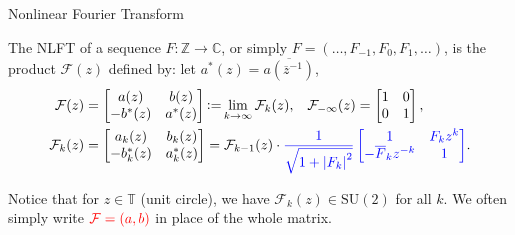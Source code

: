 \begin{frame}{Nonlinear Fourier Transform}
    \begin{definition}
        The NLFT of a sequence $F:\mathbb{Z}\rightarrow \mathbb{C}$, or simply $F = (\ldots,F_{-1},F_0,F_1,\ldots)$, is the product $\mathcal{F}(z)$ defined by: let $a^*(z) = \overline{a(\overline{z}^{-1})}$,
        \begin{align}
            \mathcal{F}(z) &= \left[\begin{matrix}
                a(z) & b(z) \\ -b^*(z) & a^*(z)
            \end{matrix}\right] \operatorname{\vcentcolon=} \lim_{k\rightarrow\infty} \mathcal{F}_k(z),\;\;\; \mathcal{F}_{-\infty}(z) = \left[\begin{matrix}
                1 & 0 \\ 0 & 1
            \end{matrix}\right], \\
            \mathcal{F}_k(z) &= \left[\begin{matrix}
                a_k(z) & b_k(z) \\ -b_k^*(z) & a_k^*(z)
            \end{matrix}\right] = \mathcal{F}_{k-1}(z) \cdot {\color{blue}\frac{1}{\sqrt{1+\left|{F_k}\right|^2}}\left[\begin{matrix}
                1 & F_kz^k \\ -\overline{F}_kz^{-k} & 1
            \end{matrix}\right]}.
        \end{align}
    \end{definition}
    
    Notice that for $z\in\mathbb{T}$ (unit circle), we have $\mathcal{F}_k(z)\in\mathrm{SU}(2)$ for all $k$. We often simply write $\color{red}\mathcal{F} = (a,b)$ in place of the whole matrix.
\end{frame}
